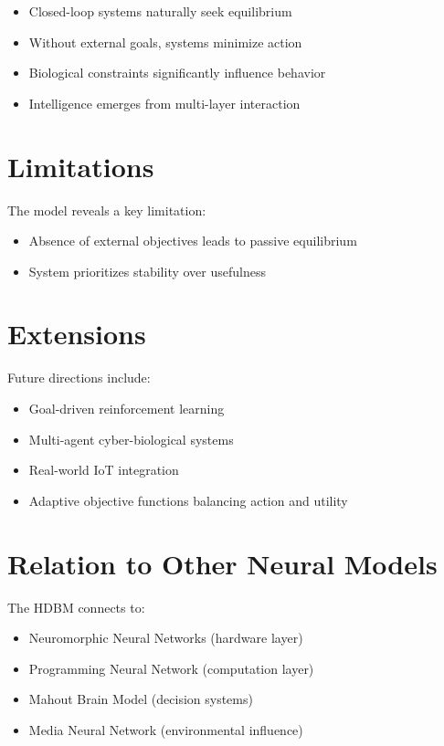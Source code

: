 \documentclass[12pt]{article}
\begin{document}
\begin{itemize}
\item Closed-loop systems naturally seek equilibrium
\item Without external goals, systems minimize action
\item Biological constraints significantly influence behavior
\item Intelligence emerges from multi-layer interaction
\end{itemize}

\section{Limitations}

The model reveals a key limitation:

\begin{itemize}
\item Absence of external objectives leads to passive equilibrium
\item System prioritizes stability over usefulness
\end{itemize}

\section{Extensions}

Future directions include:

\begin{itemize}
\item Goal-driven reinforcement learning
\item Multi-agent cyber-biological systems
\item Real-world IoT integration
\item Adaptive objective functions balancing action and utility
\end{itemize}

\section{Relation to Other Neural Models}

The HDBM connects to:

\begin{itemize}
\item Neuromorphic Neural Networks (hardware layer)
\item Programming Neural Network (computation layer)
\item Mahout Brain Model (decision systems)
\item Media Neural Network (environmental influence)
\end{itemize}
\end{document}
